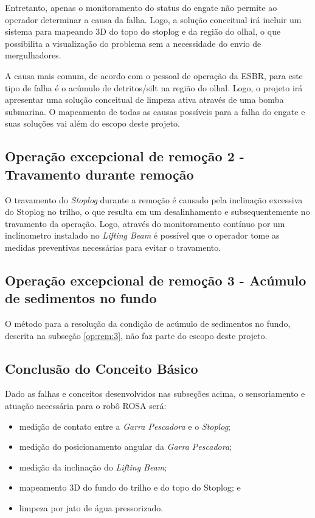 Entretanto, apenas o monitoramento do status do engate não permite ao operador determinar a causa da falha. Logo, a solução conceitual irá incluir um sistema para mapeando 3D do topo do stoplog e da região do olhal, o que possibilita a visualização do problema sem a necessidade do envio
de mergulhadores. 

A causa mais comum, de acordo com o pessoal de operação da ESBR, para este tipo de falha é o acúmulo de detritos/silt na região do olhal. Logo, o projeto irá apresentar uma solução conceitual de limpeza ativa através de uma bomba submarina. O mapeamento de todas as causas possíveis para a falha do engate e suas soluções vai além do escopo deste projeto. 


\subsection{Operação excepcional de remoção 2 - Travamento durante remoção}

O travamento do \emph{Stoplog} durante a remoção é causado pela inclinação excessiva do Stoplog no trilho, o que resulta em um desalinhamento e subsequentemente no travamento da operação. Logo, através do monitoramento contínuo por um inclínometro instalado no \emph{Lifting Beam} é possível que o operador tome as medidas preventivas necessárias para evitar o travamento.   


\subsection{Operação excepcional de remoção 3 - Acúmulo de sedimentos no fundo}
O método para a resolução da condição de acúmulo de sedimentos no fundo,
descrita na subseção \ref{op:rem:3}, não faz parte do escopo deste projeto.



\subsection{Conclusão do Conceito Básico}

Dado as falhas e conceitos desenvolvidos nas subseções acima, o sensoriamento e atuação necessária para o robô ROSA será: 

\begin{itemize}

	\item medição de contato entre a \emph{Garra Pescadora} e o \emph{Stoplog}; 
	\item medição do posicionamento angular da \emph{Garra Pescadora}; 
	\item medição da inclinação do \emph{Lifting Beam}; 
	\item mapeamento 3D do fundo do trilho e do topo do Stoplog; e
	\item limpeza por jato de água pressorizado. 

\end{itemize}

